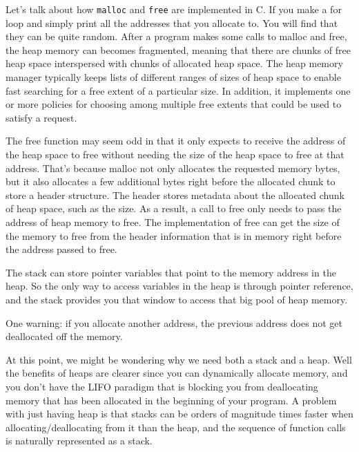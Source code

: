 \documentclass{article}
\theoremstyle{definition}
\begin{document}
    Let's talk about how \texttt{malloc} and \texttt{free} are implemented in C. If you make a for loop and simply print all the addresses that you allocate to. You will find that they can be quite random. After a program makes some calls to malloc and free, the heap memory can becomes fragmented, meaning that there are chunks of free heap space interspersed with chunks of allocated heap space. The heap memory manager typically keeps lists of different ranges of sizes of heap space to enable fast searching for a free extent of a particular size. In addition, it implements one or more policies for choosing among multiple free extents that could be used to satisfy a request.

    The free function may seem odd in that it only expects to receive the address of the heap space to free without needing the size of the heap space to free at that address. That’s because malloc not only allocates the requested memory bytes, but it also allocates a few additional bytes right before the allocated chunk to store a header structure. The header stores metadata about the allocated chunk of heap space, such as the size. As a result, a call to free only needs to pass the address of heap memory to free. The implementation of free can get the size of the memory to free from the header information that is in memory right before the address passed to free.



    The stack can store pointer variables that point to the memory address in the heap. So the only way to access variables in the heap is through pointer reference, and the stack provides you that window to access that big pool of heap memory. 

    One warning: if you allocate another address, the previous address does not get deallocated off the memory. 



    At this point, we might be wondering why we need both a stack and a heap. Well the benefits of heaps are clearer since you can dynamically allocate memory, and you don't have the LIFO paradigm that is blocking you from deallocating memory that has been allocated in the beginning of your program. A problem with just having heap is that stacks can be orders of magnitude times faster when allocating/deallocating from it than the heap, and the sequence of function calls is naturally represented as a stack. 
\end{document}
